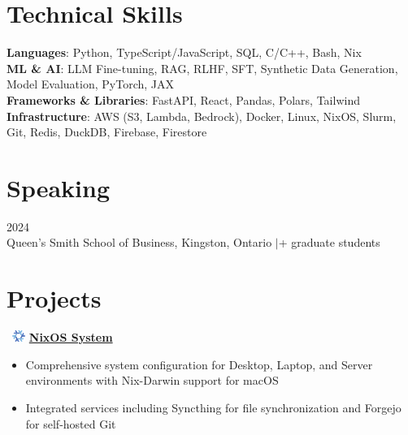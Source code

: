 \documentclass[letterpaper,10pt]{article}
\newenvironment{resumeitemize}{
  \begin{itemize}[leftmargin=0.5in, itemsep=-1pt, topsep=1pt, labelsep=0.035in]
}{
  \end{itemize}
}
\newcommand{\sectionspace}{\vspace{2pt}}
\newcommand{\afterspacespace}{\vspace{1pt}}
\begin{document}
\section{Technical Skills}

\hspace{0.15in}\textbf{Languages}: Python, TypeScript/JavaScript, SQL, C/C++, Bash, Nix \\
\hspace{0.15in}\textbf{ML \& AI}: LLM Fine-tuning, RAG, RLHF, SFT, Synthetic Data Generation, Model Evaluation, PyTorch, JAX \\
\hspace{0.15in}\textbf{Frameworks \& Libraries}: FastAPI, React, Pandas, Polars, Tailwind \\
\hspace{0.15in}\textbf{Infrastructure}: AWS (S3, Lambda, Bedrock), Docker, Linux, NixOS, Slurm, Git, Redis, DuckDB, Firebase, Firestore
\sectionspace

\section{Speaking}

\hspace{0.15in}{\bfseries Guest Lecturer on AI and Synthetic Data Generation for MMA Program} \hfill {\small 2024} \\
\hspace{0.15in}Queen's Smith School of Business, Kingston, Ontario \enspace$|$+ graduate students

\sectionspace

\section{Projects}

\hspace{0.15in}\faGithub~\includegraphics[height=1em]{assets/nix.png} \href{https://github.com/y0usaf/nixos}{\bfseries NixOS System}
\afterspacespace
\begin{resumeitemize}
\item Comprehensive system configuration for Desktop, Laptop, and Server environments with Nix-Darwin support for macOS
\item Integrated services including Syncthing for file synchronization and Forgejo for self-hosted Git
\end{resumeitemize}
\sectionspace
\end{document}
